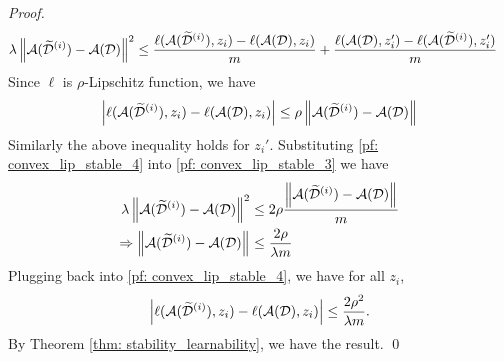\documentclass[11pt]{article}
\begin{document}
\begin{itemize}
\begin{proof}
\begin{align}
 \lambda \left\|{\mathcal A}(\widetilde{{\mathcal D}}^{(i)}) - {\mathcal A}({\mathcal D})\right\|_{}^2 &\le  \frac{\ell({\mathcal A}(\widetilde{{\mathcal D}}^{(i)}), z_i) - \ell({\mathcal A}({\mathcal D}), z_i)}{m} + \frac{\ell({\mathcal A}({\mathcal D}), z_i') - \ell({\mathcal A}(\widetilde{{\mathcal D}}^{(i)}), z_i') }{m}   \label{pf: convex_lip_stable_3}
\end{align} Since $\ell$ is $\rho$-Lipschitz function, we have
\begin{align}
\left\lvert \ell({\mathcal A}(\widetilde{{\mathcal D}}^{(i)}), z_i) - \ell({\mathcal A}({\mathcal D}), z_i) \right\rvert \le \rho \left\|{\mathcal A}(\widetilde{{\mathcal D}}^{(i)}) - {\mathcal A}({\mathcal D})\right\|_{} \label{pf: convex_lip_stable_4}
\end{align} Similarly the above inequality holds for $z_{i}'$. Substituting \eqref{pf: convex_lip_stable_4} into \eqref{pf: convex_lip_stable_3} we have 
\begin{align*}
 \lambda \left\|{\mathcal A}(\widetilde{{\mathcal D}}^{(i)}) - {\mathcal A}({\mathcal D})\right\|_{}^2 &\le 2\rho \frac{\left\|{\mathcal A}(\widetilde{{\mathcal D}}^{(i)}) - {\mathcal A}({\mathcal D})\right\|_{} }{m}\\
 \Rightarrow \left\|{\mathcal A}(\widetilde{{\mathcal D}}^{(i)}) - {\mathcal A}({\mathcal D})\right\|_{} &\le \frac{2\rho}{\lambda m}
\end{align*} Plugging back into \eqref{pf: convex_lip_stable_4}, we have for all $z_i$,
\begin{align*}
\left\lvert \ell({\mathcal A}(\widetilde{{\mathcal D}}^{(i)}), z_i) - \ell({\mathcal A}({\mathcal D}), z_i) \right\rvert \le \frac{2 \rho^2}{\lambda m}.
\end{align*} By Theorem \ref{thm: stability_learnability}, we have the result. \qed
\end{proof}


\end{itemize}
\end{document}
